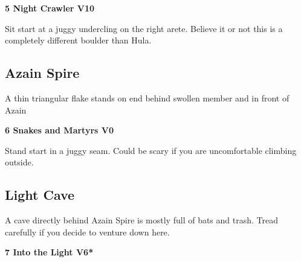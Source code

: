 \begin{multicols}{2}
\begin{minipage}{\columnwidth}
			\end{minipage}
			

					\begin{minipage}{\linewidth}	
					\label{rt:Night Crawler}
\colorbox{red!20}{
\parbox{0.95\textwidth}{
\textbf{
5 Night Crawler V10    
}
}
}

					\begin{adjustwidth}{0.5cm}{}				
					Sit start at a juggy undercling on the right arete. Believe it or not this is a completely different boulder than Hula.
					\end{adjustwidth}
					\end{minipage}
			\begin{minipage}{\columnwidth}
			\subsection*{Azain Spire}\label{bf:Azain Spire}
			A thin triangular flake stands on end behind swollen member and in front of Azain
			
			\end{minipage}
			

					\begin{minipage}{\linewidth}	
					\label{rt:Snakes and Martyrs}
\colorbox{green!20}{
\parbox{0.95\textwidth}{
\textbf{
6 Snakes and Martyrs V0     
}
}
}

					\begin{adjustwidth}{0.5cm}{}				
					 Stand start in a juggy seam. Could be scary if you are uncomfortable climbing outside.
					\end{adjustwidth}
					\end{minipage}
			\begin{minipage}{\columnwidth}
			\subsection*{Light Cave}\label{bf:Light Cave}
			A cave directly behind Azain Spire is mostly full of bats and trash. Tread carefully if you decide to venture down here.
			
			\end{minipage}
			
					\begin{minipage}{\linewidth}	
					\label{rt:Into the Light}
\colorbox{RoyalBlue!20}{
\parbox{0.95\textwidth}{
\textbf{
7 Into the Light V6*  
}
}
}


\end{minipage}
\end{multicols}
